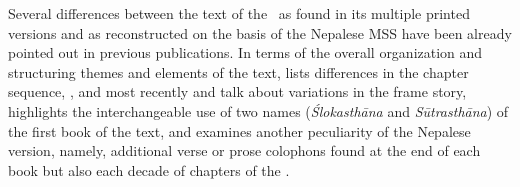 

Several differences between the text of the \SS\ as found in its multiple printed versions and as reconstructed on the basis of the Nepalese MSS have been already pointed out in previous publications. In terms of the overall organization and structuring themes and elements of the text, \citet[27f.]{kleb-2021b} lists differences in the chapter sequence, \citet{wuja-2013}, \citet[28-32]{kleb-2021b} and most recently \citet{birc-2021} and \citet[2-4]{birc-2021a} talk about variations in the frame story, \citet[32-36]{kleb-2021b} highlights the interchangeable use of two names (\emph{Ślokasthāna} and \emph{Sūtrasthāna}) of the first book of the text, and \citet[37-44]{kleb-2021b} examines another peculiarity of the Nepalese version, namely, additional verse or prose colophons found at the end of each book but also each decade of chapters of the \SS. 

